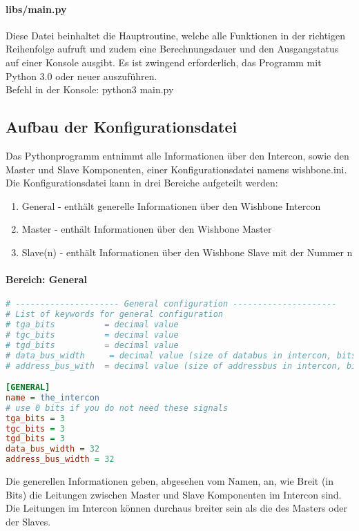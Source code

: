 \documentclass{article}
\newcommand{\nl}{\leavevmode\newline}
\begin{document}
\paragraph{libs/main.py} \nl
Diese Datei beinhaltet die Hauptroutine, welche alle Funktionen in der richtigen Reihenfolge aufruft und zudem eine Berechnungsdauer und den Ausgangstatus auf einer Konsole ausgibt. Es ist zwingend erforderlich, das Programm mit Python 3.0 oder neuer auszuführen.\\
Befehl in der Konsole: python3 main.py\
\subsection{Aufbau der Konfigurationsdatei}
Das Pythonprogramm entnimmt alle Informationen über den Intercon, sowie den Master und Slave Komponenten, einer Konfigurationsdatei namens \glqq wishbone.ini\grqq .
Die Konfigurationsdatei kann in drei Bereiche aufgeteilt werden:
\begin{enumerate}
\item General - enthält generelle Informationen über den Wishbone Intercon
\item Master - enthält Informationen über den Wishbone Master
\item Slave(n) - enthält Informationen über den Wishbone Slave mit der Nummer \glqq n\grqq
\end{enumerate}
\newpage
\paragraph{Bereich: General}\nl
\begin{lstlisting}[language={Ini},frame=single]
# --------------------- General configuration ---------------------
# List of keywords for general configuration
# tga_bits          = decimal value
# tgc_bits          = decimal value
# tgd_bits          = decimal value
# data_bus_width     = decimal value (size of databus in intercon, bits)
# address_bus_with  = decimal value (size of addressbus in intercon, bits)

[GENERAL]
name = the_intercon
# use 0 bits if you do not need these signals
tga_bits = 3
tgc_bits = 3
tgd_bits = 3
data_bus_width = 32
address_bus_width = 32
\end{lstlisting}
Die generellen Informationen geben, abgesehen vom Namen, an, wie Breit (in Bits) die Leitungen zwischen Master und Slave Komponenten im Intercon sind. Die Leitungen im Intercon können durchaus breiter sein als die des Masters oder der Slaves.
\newpage
\end{document}
